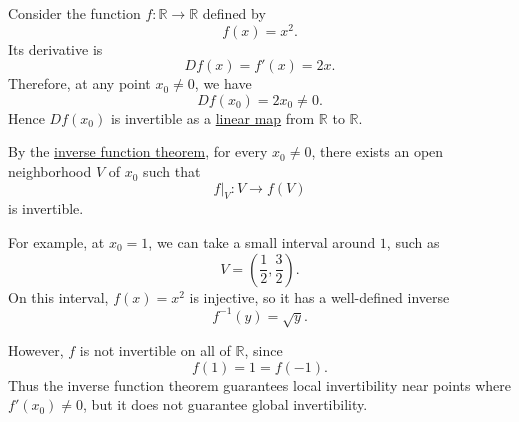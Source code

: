 	\begin{example}
	  \label{ex:a-univariate-example}
		Consider the function $f:\mathbb{R} \to \mathbb{R}$ defined by
		\begin{equation}
			f(x) = x^2.
		\end{equation}
		Its derivative is
		\begin{equation}
			Df(x) = f'(x) = 2x.
		\end{equation}
		Therefore, at any point $x_0 \neq 0$, we have
		\begin{equation}
			Df(x_0) = 2x_0 \neq 0.
		\end{equation}
		Hence $Df(x_0)$ is invertible as a \hyperref[lin-def:linear_map]{linear map} from $\mathbb{R}$ to
		$\mathbb{R}$.

		By the \hyperref[thm:inverse-function-theorem]{inverse function theorem}, for every $x_0 \neq 0$, there exists an
		open neighborhood $V$ of $x_0$ such that
		\begin{equation}
			f|_V : V \to f(V)
		\end{equation}
		is invertible.

		For example, at $x_0 = 1$, we can take a small interval around $1$, such as
		\begin{equation}
			V = \left(\frac{1}{2}, \frac{3}{2}\right).
		\end{equation}
		On this interval, $f(x)=x^2$ is injective, so it has a well-defined inverse
		\begin{equation}
			f^{-1}(y) = \sqrt{y}.
		\end{equation}

		However, $f$ is not invertible on all of $\mathbb{R}$, since
		\begin{equation}
			f(1) = 1 = f(-1).
		\end{equation}
		Thus the inverse function theorem guarantees local invertibility near
		points where $f'(x_0)\neq 0$, but it does not guarantee global invertibility.
	\end{example}

